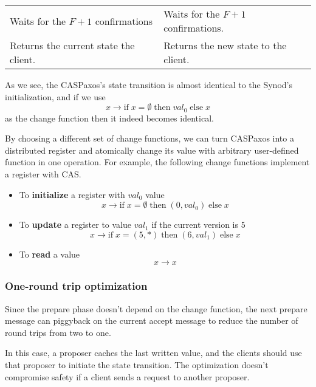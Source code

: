 \documentclass[a4paper,USenglish]{lipics-v2018}
\theoremstyle{definition}
\begin{document}
\begin{center}
\begin{longtable}{p{15em}|p{15em}}
        
        Waits for the $F+1$ confirmations
        &
        Waits for the $F+1$ confirmations. \\[6pt]
        
        
        Returns the current state the client.
        &
        Returns the new state to the client. \\[6pt]
        
        \hline
    \end{longtable}
\end{center}

As we see, the CASPaxos's state transition is almost identical to the Synod's initialization, and if we use
$$x \to \mbox{if}\; x = \emptyset \;\mbox{then}\; val_0\; \mbox{else}\; x$$
as the change function then it indeed becomes identical.

By choosing a different set of change functions, we can turn CASPaxos into a distributed register and atomically change its value with arbitrary user-defined function in one operation. For example, the following change functions implement a register with CAS.

\begin{itemize}
    \item To {\bf initialize} a register with $val_0$ value
    $$x \to \mbox{if}\; x = \emptyset \;\mbox{then}\; (0, val_0)\; \mbox{else}\; x$$
    
    \item To {\bf update} a register to value $val_1$ if the current version is $5$
    $$x \to \mbox{if}\; x = (5, \ast) \;\mbox{then}\; (6, val_1)\; \mbox{else}\; x$$
    
    \item To {\bf read} a value
    $$x \to x$$
\end{itemize}

\subsubsection{One-round trip optimization}\label{1rtt}

Since the prepare phase doesn't depend on the change function, the next prepare message can piggyback on the current accept message to reduce the number of round trips from two to one.

In this case, a proposer caches the last written value, and the clients should use that proposer to initiate the state transition. The optimization doesn't compromise safety if a client sends a request to another proposer.
\end{document}

